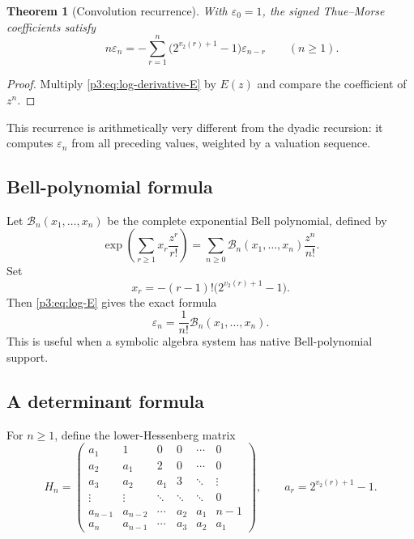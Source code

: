 \documentclass[11pt,oneside]{article}
\newtheorem{theorem}{Theorem}[section]
\theoremstyle{definition}
\theoremstyle{remark}
\newcommand{\vtwo}{v_2}
\newcommand{\eps}{\varepsilon}
\newcommand{\Bell}{\mathcal B}
\begin{document}
\begin{theorem}[Convolution recurrence]\label{p3:thm:convolution-recurrence}
With $\eps_0=1$, the signed Thue--Morse coefficients satisfy
\begin{equation}\label{p3:eq:convolution-recurrence}
 \boxed{\qquad
 n\eps_n=-\sum_{r=1}^{n}
       \bigl(2^{\vtwo(r)+1}-1\bigr)\eps_{n-r}
 \qquad(n\ge1).}
\end{equation}
\end{theorem}

\begin{proof}
Multiply \cref{p3:eq:log-derivative-E} by $E(z)$ and compare the coefficient of
$z^n$.
\end{proof}

This recurrence is arithmetically very different from the dyadic recursion:
it computes $\eps_n$ from all preceding values, weighted by a valuation
sequence.

\subsection{Bell-polynomial formula}

Let $\Bell_n(x_1,\ldots,x_n)$ be the complete exponential Bell polynomial,
defined by
\begin{equation}\label{p3:eq:Bell-definition}
 \exp\!\left(\sum_{r\ge1}x_r\frac{z^r}{r!}\right)
 =\sum_{n\ge0}\Bell_n(x_1,\ldots,x_n)\frac{z^n}{n!}.
\end{equation}
Set
\begin{equation}\label{p3:eq:Bell-xr}
 x_r=-(r-1)!\bigl(2^{\vtwo(r)+1}-1\bigr).
\end{equation}
Then \cref{p3:eq:log-E} gives the exact formula
\begin{equation}\label{p3:eq:Bell-epsilon}
 \boxed{\qquad
 \eps_n=\frac1{n!}\Bell_n(x_1,\ldots,x_n).
 \qquad}
\end{equation}
This is useful when a symbolic algebra system has native Bell-polynomial
support.

\subsection{A determinant formula}

For $n\ge1$, define the lower-Hessenberg matrix
\begin{equation}\label{p3:eq:Hn}
 H_n=\begin{pmatrix}
 a_1&1&0&0&\cdots&0\\
 a_2&a_1&2&0&\cdots&0\\
 a_3&a_2&a_1&3&\ddots&\vdots\\
 \vdots&\vdots&\ddots&\ddots&\ddots&0\\
 a_{n-1}&a_{n-2}&\cdots&a_2&a_1&n-1\\
 a_n&a_{n-1}&\cdots&a_3&a_2&a_1
 \end{pmatrix},
 \qquad a_r=2^{\vtwo(r)+1}-1.
\end{equation}
\end{document}
